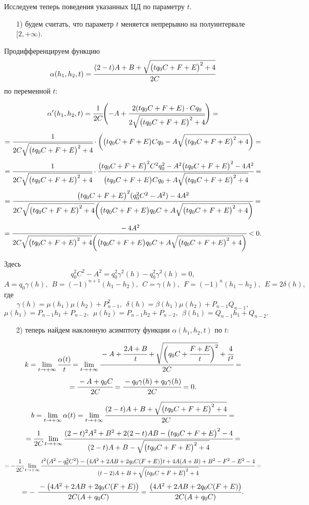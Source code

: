Исследуем теперь поведения указанных ЦД по параметру $t$.
\begin{enumerate}
\item[1)]
будем считать, что параметр $t$ меняется непрерывно на полуинтервале $[2,+\infty)$.
\end{enumerate}
Продифференцируем функцию
\[\alpha(h_{1},h_{2},t)=\cfrac{(2-t)A+B+\sqrt{\bigl(tq_{0}C+F+E\bigr)^{2}+4}}{2C}\]
по переменной $t$:

\[\alpha^{\prime}(h_{1},h_{2},t)=\cfrac{1}{2C}\Biggl(-A+\cfrac{2(tq_{0}C+F+E)\cdot C{q_{0}}}{2\sqrt{\bigl(tq_{0}C+F+E\bigr)^{2}+4}}\Biggr)=\]
\[=\cfrac1{2C\sqrt{\bigl(tq_{0}C+F+E\bigr)^{2}+4}}\cdot \biggl(\bigl(tq_{0}C+F+E\bigr)Cq_{0}-A\sqrt{\bigl(tq_{0}C+F+E\bigr)^{2}+4}\biggr)=\]
\[=\cfrac1{2C\sqrt{\bigl(tq_{0}C+F+E\bigr)^{2}+4}}\cdot \cfrac {\bigl(tq_{0}C+F+E\bigr)^{2}C^{2}{q^{2}_{0}}-A^{2}\bigl(tq_{0}C+F+E\bigr)^{2}-4A^{2}}
{\bigl(tq_{0}C+F+E\bigr)Cq_{0}+A\sqrt{\bigl(tq_{0}C+F+E\bigr)^{2}+4}}=\]
\[=\cfrac{\bigl(tq_{0}C+F+E\bigr)^{2}({q^{2}_{0}}C^{2}-A^{2})-4A^{2}}{2C\sqrt{\bigl(tq_{0}C+F+E\bigr)^{2}+4}\biggl(\bigl(tq_{0}C+F+E\bigr)q_{0}C+A\sqrt{\bigl(tq_{0}C+F+E\bigr)^{2}+4}\biggr)}=\]
\[=\cfrac {-4A^{2}}{2C\sqrt{\bigl(tq_{0}C+F+E\bigr)^{2}+4}\biggl(\bigl(tq_{0}C+F+E\bigr)q_{0}C+A\sqrt{\bigl(tq_{0}C+F+E\bigr)^{2}+4}\biggr)}<0.\]

Здесь \[{q^{2}_{0}}C^{2}-A^{2}={q^{2}_{0}}\gamma^{2}(h)-{q^{2}_{0}}\gamma^{2}(h)=0,\]
\[A=q_{0}\gamma(h), \ \ B=(-1)^{n+1}(h_{1}-h_{2}),\ \ C=\gamma(h), \ \ F=(-1)^{n}(h_{1}-h_{2}), \ \ E=2\delta(h),\]
где \[\gamma(h)=\mu(h_{1})\mu(h_{2})+P^{2}_{n-1}, \ \ \delta(h)=\beta(h_{1})\mu(h_{2})+P_{n-1}Q_{n-1},\]
\[\mu(h_{1})=P_{n-1}h_{1}+P_{n-2}, \ \ \mu(h_{2})=P_{n-1}h_{2}+P_{n-2}, \ \ \beta(h_{1})=Q_{n-1}h_{1}+Q_{n-2}.\]

\begin{enumerate}
\item[2)] теперь найдем наклонную асимптоту функции $\alpha(h_{1},h_{2},t)$ по $t$:
\end{enumerate}
\[k=\lim_{t\to +\infty}\cfrac{\alpha(t)}{t}=\lim_{t\to +\infty}\cfrac{-A+\cfrac{2A+B}{t}+\sqrt{\biggl(q_{0}C+\cfrac{F+E}{t}\biggr)^{2}}+\cfrac4{t^{2}}}{2C}=\]
\[=\cfrac{-A+q_{0}C}{2C}=\cfrac{-q_{0}\gamma(h)+q_{0}\gamma(h)}{2C}=0.\]

\[b=\lim_{t\to +\infty}\alpha(t)=\lim_{t\to +\infty}\cfrac{(2-t)A+B+\sqrt{\bigl(tq_{0}C+F+E\bigr)^{2}+4}}{2C}=\]
\[=\cfrac1{2C}\lim_{t\to +\infty}\cfrac{(2-t)^{2}A^{2}+B^{2}+2(2-t)AB-\bigl(tq_{0}C+F+E\bigr)^{2}-4}{(2-t)A+B-\sqrt{\bigl(tq_{0}C+F+E\bigr)^{2}+4}}=\]
\small \[=-\cfrac{1}{2C}\lim_{t\to +\infty}\cfrac{t^{2}\bigl(A^{2}-{q^{2}_{0}}C^{2}\bigr)-\bigl(4A^{2}+2AB+2q_{0}C(F+E)\bigr)t+4A(A+B)+B^{2}-F^{2}-E^{2}-4}
{(t-2)A+B+\sqrt{\bigl(tq_{0}C+F+E\bigr)^{2}+4}}=\]
\normalsize
\[=- \ \cfrac{-\bigl(4A^{2}+2AB+2q_{0}C(F+E)\bigr)}{2C(A+q_{0}C)}=\cfrac{\bigl(4A^{2}+2AB+2q_{0}C(F+E)\bigr)}{2C(A+q_{0}C)}.\]


